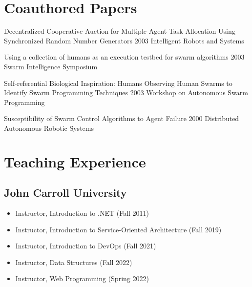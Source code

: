 \documentclass{cv_style}
\begin{document}
	\section{Coauthored Papers}
		\begin{etaremune}			
			\item \paper
				{Decentralized Cooperative Auction for Multiple Agent Task Allocation Using Synchronized Random Number Generators}
				{2003 Intelligent Robots and Systems}

			\item \paper
				{Using a collection of humans as an execution testbed for swarm algorithms}
				{2003 Swarm Intelligence Symposium}

			\item \paper
				{Self-referential Biological Inspiration: Humans Observing Human Swarms to Identify Swarm Programming Techniques}
				{2003 Workshop on Autonomous Swarm Programming}

			\item \paper
				{Susceptibility of Swarm Control Algorithms to Agent Failure}
				{2000 Distributed Autonomous Robotic Systems}


		\end{etaremune}
		
		
		
	\section{Teaching Experience}
		\subsection{John Carroll University}
		\begin{itemize}
			\item Instructor, Introduction to .NET (Fall 2011)
			\item Instructor, Introduction to Service-Oriented Architecture (Fall 2019)
			\item Instructor, Introduction to DevOps (Fall 2021)
			\item Instructor, Data Structures (Fall 2022)
			\item Instructor, Web Programming (Spring 2022)
		\end{itemize}
		
\end{document}
